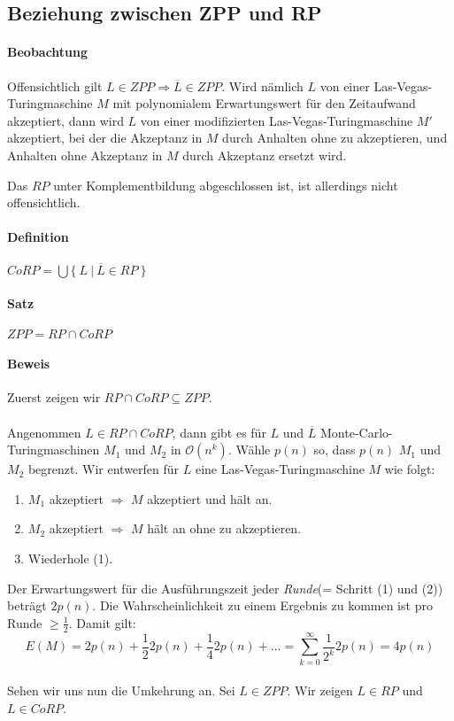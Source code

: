 \subsection{Beziehung zwischen ZPP und RP}
\paragraph{Beobachtung}
Offensichtlich gilt $L \in ZPP \Rightarrow \overline{L} \in ZPP$.
Wird nämlich $L$ von einer Las-Vegas-Turingmaschine $M$ mit polynomialem Erwartungswert für den Zeitaufwand akzeptiert, dann wird $L$ von einer modifizierten Las-Vegas-Turingmaschine $M'$ akzeptiert, bei der die Akzeptanz in $M$ durch Anhalten ohne zu akzeptieren, und Anhalten ohne Akzeptanz in $M$ durch Akzeptanz ersetzt wird.

Das $RP$ unter Komplementbildung abgeschlossen ist, ist allerdings nicht offensichtlich.

\paragraph{Definition}
$CoRP = \bigcup \bigl\{\ L\ \bigl\lvert\ \overline{L} \in RP\ \}$

\paragraph{Satz}
$ZPP = RP \cap CoRP$

\paragraph{Beweis}
Zuerst zeigen wir $RP \cap CoRP \subseteq ZPP$.\\
\\
Angenommen $L \in RP \cap CoRP$, dann gibt es für $L$ und $\overline{L}$ Monte-Carlo-Turingmaschinen $M_1$ und $M_2$ in $\mathcal{O}(n^k)$.
Wähle $p(n)$ so, dass $p(n)$ $M_1$ und $M_2$ begrenzt.
Wir entwerfen für $L$ eine Las-Vegas-Turingmaschine $M$ wie folgt:
\begin{enumerate}
	\item $M_1$ akzeptiert $\Rightarrow$ $M$ akzeptiert und hält an.
	\item $M_2$ akzeptiert $\Rightarrow$ $M$ hält an ohne zu akzeptieren.
	\item Wiederhole (1).
\end{enumerate}
Der Erwartungswert für die Ausführungszeit jeder \emph{Runde}(= Schritt (1) und (2)) beträgt $2p(n)$.
Die Wahrscheinlichkeit zu einem Ergebnis zu kommen ist pro Runde $\geq \frac{1}{2}$.
Damit gilt:
\begin{equation*}
	E(M) = 2p(n) + \frac{1}{2}2p(n) + \frac{1}{4}2p(n) + ... = \sum\limits_{k=0}^{\infty}\frac{1}{2^k}2p(n) = 4p(n)
\end{equation*}
\\
Sehen wir uns nun die Umkehrung an.
Sei $L \in ZPP$.
Wir zeigen $L \in RP$ und $L \in CoRP$.

